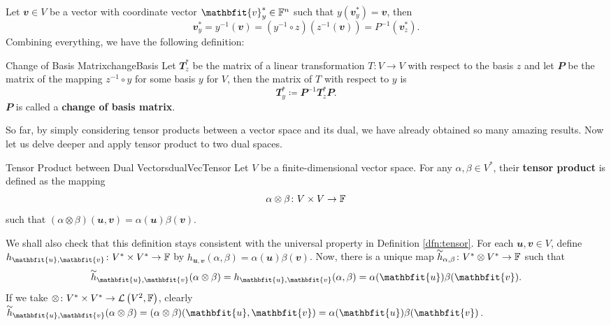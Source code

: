 \documentclass[math]{amznotes}
\renewcommand\widetilde[1]{\ThisStyle{%
  \setbox0=\hbox{$\SavedStyle#1$}%
  \stackengine{1pt-\LMpt}{$\SavedStyle#1$}{%
    \stretchto{\scaleto{\SavedStyle\mkern.2mu\sim}{.5467\wd0}}{.5\ht0}%
  }{O}{c}{F}{T}{S}%
}}
\theoremstyle{remark}
\begin{document}
Let $\mathbfit{v} \in V$ be a vector with coordinate vector $\mathbfit{v}_y^* \in \F^n$ such that $y(\mathbfit{v}_y^*) = \mathbfit{v}$, then 
\begin{equation*}
    \mathbfit{v}^*_y = y^{-1}(\mathbfit{v}) = \left(y^{-1} \circ z\right)\left(z^{-1}(\mathbfit{v})\right) = P^{-1}\left(\mathbfit{v}^*_z\right).
\end{equation*}
Combining everything, we have the following definition:
\begin{dfnbox}{Change of Basis Matrix}{changeBasis}
    Let $\mathbfit{T}_z^*$ be the matrix of a linear transformation $T \colon V \to V$ with respect to the basis $z$ and let $\mathbfit{P}$ be the matrix of the mapping $z^{-1} \circ y$ for some basis $y$ for $V$, then the matrix of $T$ with respect to $y$ is 
    \begin{equation*}
        \mathbfit{T}^*_y \coloneqq \mathbfit{P}^{-1}\mathbfit{T}_z^*\mathbfit{P}.
    \end{equation*}
    $\mathbfit{P}$ is called a {\color{red} \textbf{change of basis matrix}}.
\end{dfnbox}
So far, by simply considering tensor products between a vector space and its dual, we have already obtained so many amazing results. Now let us delve deeper and apply tensor product to two dual spaces.
\begin{dfnbox}{Tensor Product between Dual Vectors}{dualVecTensor}
    Let $V$ be a finite-dimensional vector space. For any $\alpha, \beta \in V^*$, their {\color{red} \textbf{tensor product}} is defined as the mapping 
    \begin{equation*}
        \alpha \otimes \beta \colon V \times V \to \mathbb{F}
    \end{equation*}
    such that $(\alpha \otimes \beta)(\mathbfit{u}, \mathbfit{v}) = \alpha(\mathbfit{u})\beta(\mathbfit{v})$.
\end{dfnbox}
We shall also check that this definition stays consistent with the universal property in Definition \ref{dfn:tensor}. For each $\mathbfit{u}, \mathbfit{v} \in V$, define $h_{\mathbfit{u}, \mathbfit{v}} \colon V^* \times V^* \to \F$ by $h_{\mathbfit{u}, \mathbfit{v}}(\alpha, \beta) = \alpha(\mathbfit{u})\beta(\mathbfit{v})$. Now, there is a unique map $\widetilde{h}_{\alpha, \beta} \colon V^* \otimes V^* \to \F$ such that 
\begin{equation*}
    \widetilde{h}_{\mathbfit{u}, \mathbfit{v}}(\alpha \otimes \beta) = h_{\mathbfit{u}, \mathbfit{v}}(\alpha, \beta) = \alpha(\mathbfit{u})\beta(\mathbfit{v}).
\end{equation*}
If we take $\otimes \colon V^* \times V^* \to \mathcal{L}\left(V^2, \mathbb{F}\right)$, clearly $\widetilde{h}_{\mathbfit{u}, \mathbfit{v}}(\alpha \otimes \beta) = (\alpha \otimes \beta)(\mathbfit{u}, \mathbfit{v}) = \alpha(\mathbfit{u})\beta(\mathbfit{v})$.
\end{document}
